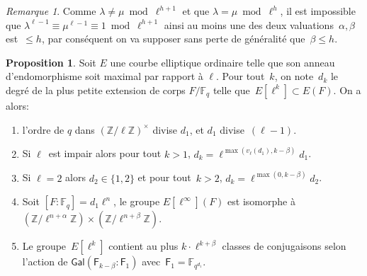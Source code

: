 \documentclass[10pt,a4paper]{book}
\theoremstyle{plain}
\theoremstyle{definition}
\theoremstyle{definition}
\theoremstyle{definition}
\newtheorem{prop}[thm]{Proposition}
\theoremstyle{definition}
\theoremstyle{remark}
\newtheorem{rem}[thm]{Remarque}
\theoremstyle{remark}
\theoremstyle{definition}
\begin{document}
\begin{rem} 
Comme $\lambda \neq \mu \bmod{\ell^{h+1}}$
et que $\lambda = \mu \bmod \ell^h$, il est impossible que $\lambda^{\ell-1} 
\equiv \mu^{\ell-1} \equiv 1 \bmod{\ell^{h+1}}$ ainsi au moins une des deux 
valuations~$\alpha, \beta$ est~$\leqslant h$, par conséquent on va supposer 
sans perte de généralité que~$\beta \leqslant h$.
\end{rem}

\begin{prop}\label{pro:clas:fro}
Soit $E$ une courbe elliptique ordinaire telle que son anneau d'endomorphisme 
soit maximal par rapport à $\ell$. Pour tout~$k$, on note~$d_k$ le degré de la 
plus petite extension de corps $F/\mathbb{F}_q$ telle que~$E[\ell^k]\subset 
E(F)$. On  a alors:
\begin{enumerate}
\item l'ordre de $q$ dans $(\mathbb{Z}/ \ell \mathbb{Z})^\times$ divise $d_1$,
et $d_1$ divise~$(\ell-1)$.
\item Si $\ell$~est impair alors pour tout $k > 1$,
$ d_k = \ell^{\max (v_{\ell} (d_1), k - \beta)}d_1$.
\item Si $\ell=2$ alors $d_2 \in \{1,2\}$ et pour tout~$k > 2$,
$d_k = \ell^{\max (0, k - \beta)}d_2$.
\item Soit $[F:\mathbb{F}_q]=d_1\ell^n$, le groupe $E[\ell^{\infty}](F)$ est isomorphe à~$(\mathbb{Z}/\ell^{n+\alpha} \mathbb{Z}) \times (\mathbb{Z}/\ell^{n+\beta} \mathbb{Z})$.
\item\label{prop:classes:count} Le groupe~$E[\ell^k]$ contient au plus
$k \cdot \ell^{k+\beta}$ classes de conjugaisons selon l'action de $\mathsf{Gal}(\mathsf{F}_{k-\beta}:\mathsf{F}_1)$ avec~$\mathsf{F}_1 = \mathbb{F}_{q^{d_1}}$.
\end{enumerate}
\end{prop}

\end{document}
